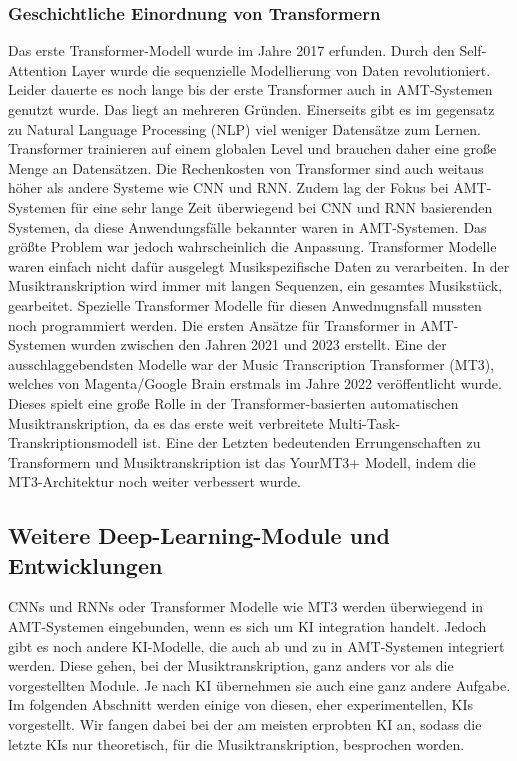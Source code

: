 \subsubsection{Geschichtliche Einordnung von Transformern}
Das erste Transformer-Modell wurde im Jahre 2017 erfunden.
\cite{vaswani2017attention}
Durch den Self-Attention Layer wurde die sequenzielle Modellierung von Daten revolutioniert.
Leider dauerte es noch lange bis der erste Transformer auch in AMT-Systemen genutzt wurde.
Das liegt an mehreren Gründen.
Einerseits gibt es im gegensatz zu Natural Language Processing (NLP) viel weniger Datensätze zum Lernen.
Transformer trainieren auf einem globalen Level und brauchen daher eine große Menge an Datensätzen.
Die Rechenkosten von Transformer sind auch weitaus höher als andere Systeme wie CNN und RNN.
Zudem lag der Fokus bei AMT-Systemen für eine sehr lange Zeit überwiegend bei CNN und RNN basierenden Systemen,
da diese Anwendungsfälle bekannter waren in AMT-Systemen.
Das größte Problem war jedoch wahrscheinlich die Anpassung.
Transformer Modelle waren einfach nicht dafür ausgelegt Musikspezifische Daten zu verarbeiten.
In der Musiktranskription wird immer mit langen Sequenzen, ein gesamtes Musikstück, gearbeitet.
Spezielle Transformer Modelle für diesen Anwednugnsfall mussten noch programmiert werden.
Die ersten Ansätze für Transformer in AMT-Systemen wurden zwischen den Jahren 2021 und 2023 erstellt.
Eine der ausschlaggebendsten Modelle war der Music Transcription Transformer (MT3),
welches von Magenta/Google Brain erstmals im Jahre 2022 veröffentlicht wurde.
\cite{gardner2021mt3}
Dieses spielt eine große Rolle in der Transformer-basierten automatischen Musiktranskription,
da es das erste weit verbreitete Multi-Task-Transkriptionsmodell ist.
Eine der Letzten bedeutenden Errungenschaften zu Transformern und Musiktranskription ist das
YourMT3+ Modell, indem die MT3-Architektur noch weiter verbessert wurde.
\cite{chang2024yourmt3}

\subsection{Weitere Deep-Learning-Module und Entwicklungen}
CNNs und RNNs oder Transformer Modelle wie MT3 werden überwiegend in AMT-Systemen eingebunden,
wenn es sich um KI integration handelt.
Jedoch gibt es noch andere KI-Modelle, die auch ab und zu in AMT-Systemen integriert werden.
Diese gehen, bei der Musiktranskription, ganz anders vor als die vorgestellten Module.
Je nach KI übernehmen sie auch eine ganz andere Aufgabe.
Im folgenden Abschnitt werden einige von diesen, eher experimentellen, KIs vorgestellt.
Wir fangen dabei bei der am meisten erprobten KI an,
sodass die letzte KIs nur theoretisch, für die Musiktranskription, besprochen worden.

